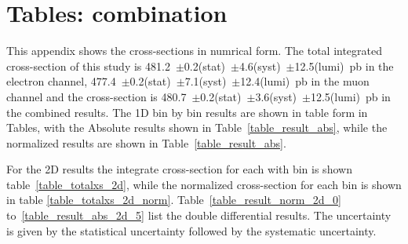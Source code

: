 \chapter{Tables: combination}
\label{app_tables_comb}
This appendix shows the cross-sections in numrical form. The total integrated cross-section of this study is 481.2~$\pm$0.2(stat)~$\pm$4.6(syst)~$\pm$12.5(lumi)~pb in the electron channel, 477.4~$\pm$0.2(stat)~$\pm$7.1(syst)~$\pm$12.4(lumi)~pb in the muon channel and the cross-section is 480.7~$\pm$0.2(stat)~$\pm$3.6(syst)~$\pm$12.5(lumi)~pb in the combined results. The 1D bin by bin results are shown in table form in Tables, with the Absolute results shown in Table~\ref{table_result_abs}, while the normalized results are shown in Table~\ref{table_result_abs}. 

For the 2D results the integrate cross-section for each with \rapidity bin is shown table~\ref{table_totalxs_2d}, while the normalized cross-section for each bin is shown in table \ref{table_totalxs_2d_norm}. 
 Table~\ref{table_result_norm_2d_0} to~\ref{table_result_abs_2d_5} list the double differential results. The uncertainty is given by the statistical uncertainty followed by the systematic uncertainty.


